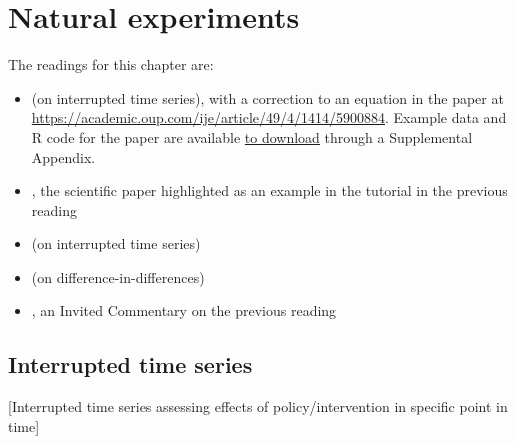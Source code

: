 \documentclass[
]{book}
\providecommand{\tightlist}{%
  \setlength{\itemsep}{0pt}\setlength{\parskip}{0pt}}
\begin{document}
\hypertarget{natural-experiments}{%
\chapter{Natural experiments}\label{natural-experiments}}

The readings for this chapter are:

\begin{itemize}
\tightlist
\item
  \citet{bernal2017interrupted} (on interrupted time series), with a correction to an equation in the paper at \url{https://academic.oup.com/ije/article/49/4/1414/5900884}. Example data and R code for the paper are available \href{https://oup.silverchair-cdn.com/oup/backfile/Content_public/Journal/ije/49/4/10.1093_ije_dyaa118/1/dyaa118_supplementary_data.zip?Expires=1623897009\&Signature=BzYQrBg60cMKHYeDU~OIZYIFuRgEIPwQsWMjzON0dB~fL8y-8x4xdGIJQBBPgDxBIoUIGnjmShVf1jlVqzloo3IldAdVC78TZ~~XseYdJ9c590QRAR6m7mH~VbPe-fCnQSnZF0z2Qw9PZcSGITZeNr4YXPVY-~gtpgBeZiN0MpgEVBLVT5fYhhQBGbp0vxl1bKdUfNtF71fdVJrglkhSG8-M24A07LmAr8jThx4MQmSAzKCxA4VZLRE6To8zC3-rJlxyWiqrSTFsVQM2SN4R6UuxYoRsILRcIAr2sUfqgmaSlxBiYAf71PdGSrnBcXX3l0l7yuAftX5PYTwMKTyxOA__\&Key-Pair-Id=APKAIE5G5CRDK6RD3PGA}{to download} through a Supplemental Appendix.
\item
  \citet{barone2011effects}, the scientific paper highlighted as an example in the tutorial in the previous reading
\item
  \citet{bor2014regression} (on interrupted time series)
\item
  \citet{casey2018retirements} (on difference-in-differences)
\item
  \citet{mendola2018invited}, an Invited Commentary on the previous reading
\end{itemize}

\hypertarget{interrupted-time-series}{%
\section{Interrupted time series}\label{interrupted-time-series}}

{[}Interrupted time series assessing effects of policy/intervention in specific point in time{]}
\end{document}
